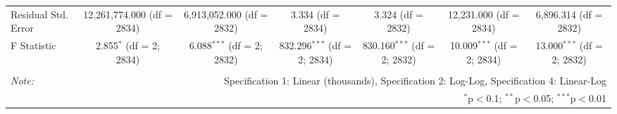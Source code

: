 \begin{table}[!htbp]
\begin{tabular}{@{\extracolsep{5pt}}lcccccc}
Residual Std. Error & 12,261,774.000 (df = 2834) & 6,913,052.000 (df = 2832) & 3.334 (df = 2834) & 3.324 (df = 2832) & 12,231.000 (df = 2834) & 6,896.314 (df = 2832) \\
F Statistic & 2.855$^{*}$ (df = 2; 2834) & 6.088$^{***}$ (df = 2; 2832) & 832.296$^{***}$ (df = 2; 2834) & 830.160$^{***}$ (df = 2; 2832) & 10.009$^{***}$ (df = 2; 2834) & 13.000$^{***}$ (df = 2; 2832) \\
\hline
\hline \\[-1.8ex]
\textit{Note:}  & \multicolumn{6}{r}{Specification 1: Linear (thousands), Specification 2: Log-Log, Specification 4: Linear-Log} \\
 & \multicolumn{6}{r}{$^{*}$p$<$0.1; $^{**}$p$<$0.05; $^{***}$p$<$0.01} \\
\end{tabular}
\end{table}
